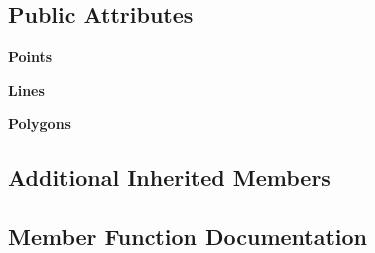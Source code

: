 \subsection*{Public Attributes}
\begin{DoxyCompactItemize}
\item 
\hypertarget{class_post_g_i_s_helpers_1_1_o_s_m_collection_a7f602b55a1c663ef35833377d674f613}{}{\bfseries Points}\label{class_post_g_i_s_helpers_1_1_o_s_m_collection_a7f602b55a1c663ef35833377d674f613}

\item 
\hypertarget{class_post_g_i_s_helpers_1_1_o_s_m_collection_a6fe91065cd9b09252963c2097227341c}{}{\bfseries Lines}\label{class_post_g_i_s_helpers_1_1_o_s_m_collection_a6fe91065cd9b09252963c2097227341c}

\item 
\hypertarget{class_post_g_i_s_helpers_1_1_o_s_m_collection_aac7591e4a09ba35e2e68fcf63bc761fa}{}{\bfseries Polygons}\label{class_post_g_i_s_helpers_1_1_o_s_m_collection_aac7591e4a09ba35e2e68fcf63bc761fa}

\end{DoxyCompactItemize}
\subsection*{Additional Inherited Members}


\subsection{Member Function Documentation}
\hypertarget{class_post_g_i_s_helpers_1_1_o_s_m_collection_af97c78e59020dafe7f277b828adf8d6e}{}
